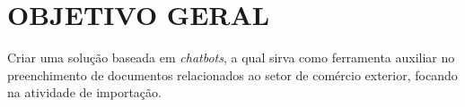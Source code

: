 \section{OBJETIVO GERAL}
\label{sec:objetivo_geral}

Criar uma solução baseada em \textit{chatbots}, a qual sirva como ferramenta auxiliar no preenchimento de documentos relacionados ao setor de comércio exterior, focando na atividade de importação.